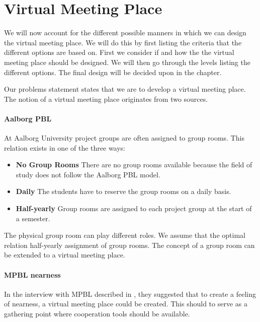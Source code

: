 \section{Virtual Meeting Place}
\label{sec:virtualMeetingPlace}

We will now account for the different possible manners in which we can design the virtual meeting place. 
We will do this by first listing the criteria that the different options are based on. 
First we consider if and how the the virtual meeting place should be designed.
We will then go through the levels listing the different options. 
The final design will be decided upon in the  chapter. 

Our problems statement states that we are to develop a virtual meeting place. 
The notion of a virtual meeting place originates from two sources.

\paragraph{Aalborg PBL} 
At Aalborg University project groups are often assigned to group rooms. This relation exists in one of the three ways:
\begin{itemize}
	\item \textbf{No Group Rooms} There are no group rooms available because the field of study does not follow the Aalborg PBL model.
	\item \textbf{Daily} The students have to reserve the group rooms on a daily basis.
	\item \textbf{Half-yearly} Group rooms are assigned to each project group at the start of a semester.
\end{itemize} 
The physical group room can play different roles. 
We assume that the optimal relation half-yearly assignment of group rooms.
The concept of a group room can be extended to a virtual meeting place.  

\paragraph{MPBL nearness}
In the interview with MPBL described in \secref{}, they suggested that to create a feeling of nearness, a virtual meeting place could be created. 
This should to serve as a gathering point where cooperation tools should be available. \\

